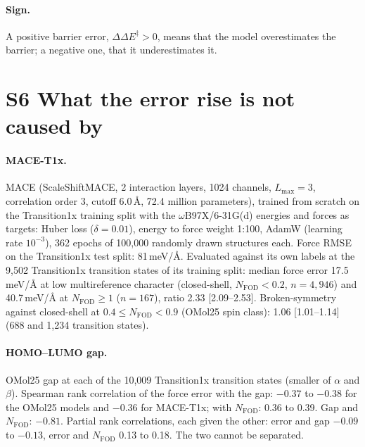 \paragraph{Sign.} A positive barrier error, $\Delta\Delta E^\ddagger > 0$, means that the model overestimates the barrier; a negative one, that it underestimates it.


\section{S6 What the error rise is not caused by}
\label{si:cause}
\paragraph{MACE-T1x.} MACE (ScaleShiftMACE, 2 interaction layers, 1024 channels, $L_\mathrm{max} = 3$, correlation order 3, cutoff 6.0\,\AA{}, 72.4 million parameters), trained from scratch on the Transition1x training split with the $\omega$B97X/6-31G(d) energies and forces as targets: Huber loss ($\delta = 0.01$), energy to force weight 1:100, AdamW (learning rate $10^{-3}$), 362 epochs of 100{,}000 randomly drawn structures each. Force RMSE on the Transition1x test split: 81\,meV/\AA{}. Evaluated against its own labels at the 9,502 Transition1x transition states of its training split: median force error 17.5\,meV/\AA{} at low multireference character (closed-shell, $N_\mathrm{FOD} < 0.2$, $n = 4{,}946$) and 40.7\,meV/\AA{} at $N_\mathrm{FOD} \geq 1$ ($n = 167$), ratio 2.33 [2.09--2.53]. Broken-symmetry against closed-shell at $0.4 \leq N_\mathrm{FOD} < 0.9$ (OMol25 spin class): 1.06 [1.01--1.14] (688 and 1,234 transition states).

\paragraph{HOMO--LUMO gap.} OMol25 gap at each of the 10,009 Transition1x transition states (smaller of $\alpha$ and $\beta$). Spearman rank correlation of the force error with the gap: $-0.37$ to $-0.38$ for the OMol25 models and $-0.36$ for MACE-T1x; with $N_\mathrm{FOD}$: 0.36 to 0.39. Gap and $N_\mathrm{FOD}$: $-0.81$. Partial rank correlations, each given the other: error and gap $-0.09$ to $-0.13$, error and $N_\mathrm{FOD}$ 0.13 to 0.18. The two cannot be separated.

